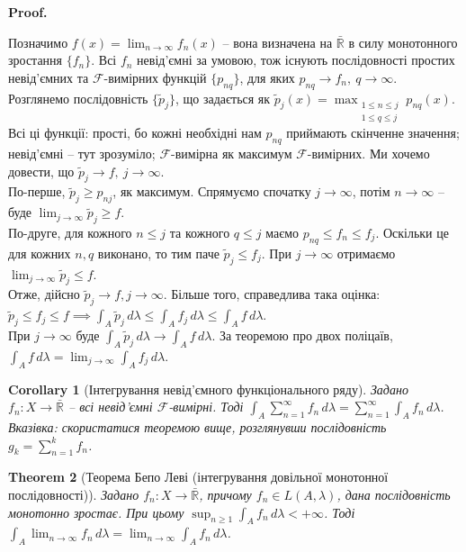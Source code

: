 \documentclass[a4paper, 10pt]{article}
\makeatletter
\theoremstyle{theoremdd}
\newtheorem{theorem}{Theorem}[subsection]
\newtheorem{corollary}[theorem]{Corollary}
\renewenvironment{proof}[1][Proof.\\]{\par
\pushQED{\hfill \qed}%
\normalfont \topsep6\p@\@plus6\p@\relax
\trivlist
\item\relax
{\bfseries
#1\@addpunct{.}}\hspace\labelsep\ignorespaces
}{%
\popQED\endtrivlist\@endpefalse
}
\makeatother
\begin{document}
\begin{proof}
Позначимо $f(x) = \displaystyle\lim_{n \to \infty} f_n(x)$ -- вона визначена на $\bar{\mathbb{R}}$ в силу монотонного зростання $\{f_n\}$. Всі $f_n$ невід'ємні за умовою, тож існують послідовності простих невід'ємних та $\mathcal{F}$-вимірних функцій $\{p_{nq}\}$, для яких $p_{nq} \to f_n,\ q \to \infty$.\\
Розглянемо послідовність $\{\tilde{p}_j\}$, що задається як $\tilde{p}_j(x) = \displaystyle\max_{\substack{1 \leq n \leq j \\ 1 \leq q \leq j}} p_{nq}(x)$. Всі ці функції: прості, бо кожні необхідні нам $p_{nq}$ приймають скінченне значення; невід'ємні -- тут зрозуміло; $\mathcal{F}$-вимірна як максимум $\mathcal{F}$-вимірних. Ми хочемо довести, що $\tilde{p}_j \to f,\ j \to \infty$.\\
По-перше, $\tilde{p}_j \geq p_{nj}$, як максимум. Спрямуємо спочатку $j \to \infty$, потім $n \to \infty$ -- буде $\displaystyle\lim_{j \to \infty} \tilde{p}_j \geq f$.\\
По-друге, для кожного $n \leq j$ та кожного $q \leq j$ маємо $p_{nq} \leq f_n \leq f_j$. Оскільки це для кожних $n,q$ виконано, то тим паче $\tilde{p}_j \leq f_j$. При $j \to \infty$ отримаємо $\displaystyle\lim_{j \to \infty} \tilde{p}_j \leq f$.\\
Отже, дійсно $\tilde{p}_j \to f, j \to \infty$. Більше того, справедлива така оцінка:\\
$\tilde{p}_j \leq f_j \leq f \implies \displaystyle \int_A \tilde{p}_j\,d\lambda \leq \int_A f_j\,d\lambda \leq \int_A f\,d\lambda$.\\
При $j \!\to \! \infty$ буде $\displaystyle\int_A \tilde{p}_j\,d\lambda \to \int_A f\,d\lambda$. За теоремою про двох поліцаїв, $\displaystyle\int_A f\,d\lambda = \lim_{j \to \infty} \int_A f_j\,d\lambda$.
\end{proof}

\begin{corollary}[Інтегрування невід'ємного функціонального ряду]
Задано $f_n \colon X \to \bar{\mathbb{R}}$ -- всі невід'ємні $\mathcal{F}$-вимірні. Тоді $\displaystyle \int_A \sum_{n=1}^\infty f_n\,d\lambda = \sum_{n=1}^\infty \int_A f_n\,d\lambda $.\\
\textit{Вказівка: скористатися теоремою вище, розглянувши послідовність $g_k = \displaystyle\sum_{n=1}^k f_n$.}
\end{corollary}

\begin{theorem}[Теорема Бепо Леві (інтегрування довільної монотонної послідовності)]
Задано $f_n \colon X \to \bar{\mathbb{R}}$, причому $f_n \in L(A,\lambda)$, дана послідовність монотонно зростає. При цьому $\displaystyle\sup_{n \geq 1} \int_A f_n\,d\lambda < +\infty$. Тоді $\displaystyle\int_A \lim_{n \to \infty} f_n\,d\lambda = \lim_{n \to \infty} \int_A f_n\,d\lambda$.
\end{theorem}
\end{document}
